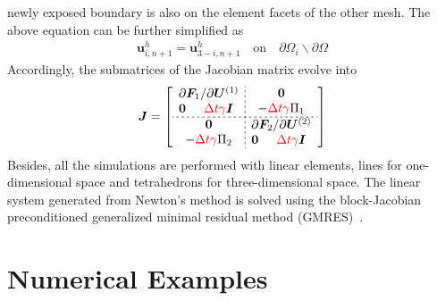 \documentclass[preprint,12pt,sort&compress]{elsarticle}
\theoremstyle{definition}%
\begin{document}
newly exposed boundary is also on the element facets of the other mesh. The above equation can be further simplified as
\begin{align}
  \bm{u}^h_{i,n+1}=\bm{u}^h_{3-i,n+1} \quad \text{on} \quad \partial\Omega_i\backslash\partial\Omega
\end{align}
Accordingly, the submatrices of the Jacobian matrix evolve into
\begin{align}
  \bm{J}
  =\left[
    \begin{array}{c;{2pt/2pt}c}
      \begin{matrix}
        \multicolumn{2}{c}{{\partial \bm{F}_1}/{\partial \bm{U}^{(1)}}} \\
        \bm{0} & \textcolor{red}{\Delta t\gamma}\bm{I}
      \end{matrix}
      &
      \begin{matrix}
        \bm{0}\\
        -\textcolor{red}{\Delta t\gamma}\Pi_1
      \end{matrix}
      \\ \hdashline[2pt/2pt]
      \begin{matrix}
        \bm{0} \\ 
        -\textcolor{red}{\Delta t\gamma}\Pi_2
      \end{matrix}
      &
      \begin{matrix}
        \multicolumn{2}{c}{{\partial \bm{F}_2}/{\partial \bm{U}^{(2)}}} \\
        \bm{0} & \textcolor{red}{\Delta t\gamma}\bm{I}
      \end{matrix}
    \end{array}
  \right]
\end{align}
Besides, all the simulations are performed with linear elements, lines for one-dimensional space and tetrahedrons for three-dimensional space. The linear system generated from Newton's method is solved
using the block-Jacobian preconditioned generalized minimal residual method (GMRES)~\cite{Saad86a}. 
\section{Numerical Examples}\label{sec:numerical-examples}
\end{document}
